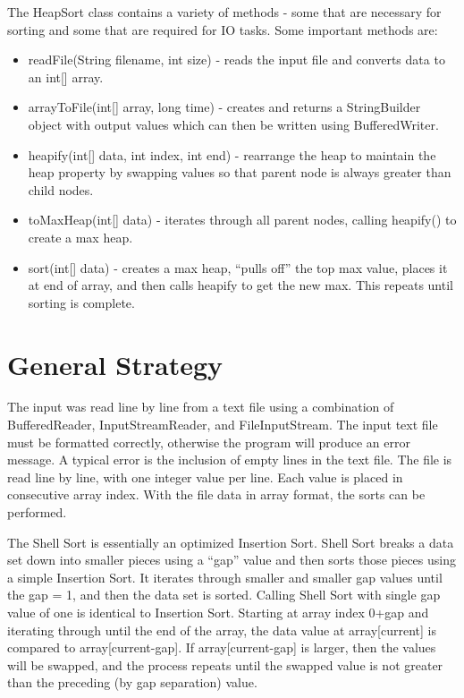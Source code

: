 \documentclass[12pt, titlepage]{article}
\begin{document}
The HeapSort class contains a variety of methods - some that are necessary for sorting and some that are required for IO tasks. Some important methods are:
\begin{itemize}
	\item readFile(String filename, int size) - reads the input file and converts data to an int[] array.
	\item arrayToFile(int[] array, long time) - creates and returns a StringBuilder object with output values which can then be written using BufferedWriter. 
	\item heapify(int[] data, int index, int end) - rearrange the heap to maintain the heap property by swapping values so that parent node is always greater than child nodes.
	\item toMaxHeap(int[] data) - iterates through all parent nodes, calling heapify() to create a max heap.
	\item sort(int[] data) - creates a max heap, ``pulls off'' the top max value, places it at end of array, and then calls heapify to get the new max. This repeats until sorting is complete.
\end{itemize}




\section{General Strategy}

The input was read line by line from a text file using a combination of BufferedReader, InputStreamReader, and FileInputStream. The input text file must be formatted correctly, otherwise the program will produce an error message. A typical error is the inclusion of empty lines in the text file. The file is read line by line, with one integer value per line. Each value is placed in consecutive array index. With the file data in array format, the sorts can be performed.

The Shell Sort is essentially an optimized Insertion Sort. Shell Sort breaks a data set down into smaller pieces using a ``gap'' value and then sorts those pieces using a simple Insertion Sort. It iterates through smaller and smaller gap values until the gap = 1, and then the data set is sorted. Calling Shell Sort with single gap value of one is identical to Insertion Sort. Starting at array index 0+gap and iterating through until the end of the array, the data value at array[current] is compared to array[current-gap]. If array[current-gap] is larger, then the values will be swapped, and the process repeats until the swapped value is not greater than the preceding (by gap separation) value. 
\end{document}
